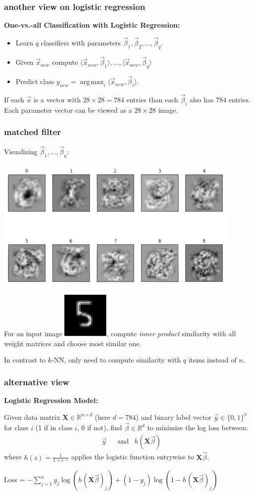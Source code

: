 \documentclass[handout,compress]{beamer}
\newcommand{\bv}[1]{\mathbf{#1}}
\newcommand{\R}{\mathbb{R}}
\DeclareMathOperator*{\argmax}{arg\,max}
\begin{document}
\begin{frame}
	\frametitle{another view on logistic regression}
	\textbf{One-vs.-all Classification with Logistic Regression:}
	\begin{itemize}
		\item Learn $q$ classifiers with parameters $\vec{\beta}_1, \vec{\beta}_2, \ldots, \vec{\beta}_q$.
		\item Given $\vec{x}_{new}$ compute $\langle \vec{x}_{new}, \vec{\beta}_1\rangle, \ldots, \langle\vec{x}_{new}, \vec{\beta}_q\rangle$
		\item Predict class $y_{new} = \argmax_i \langle\vec{x}_{new}, \vec{\beta}_i\rangle$.
	\end{itemize}
	If each $\vec{x}$ is a vector with $28\times 28 = 784$ entries than each $\vec{\beta}_i$ also has $784$ entries. Each parameter vector can be viewed as a $28\times 28$ image. 
\end{frame}

\begin{frame}
	\frametitle{matched filter}
	Visualizing $\vec{\beta}_1, \ldots, \vec{\beta}_q$:
	\begin{center}
		\includegraphics[width=.7\textwidth]{logweights.png}
	\end{center}
For an input image \hspace{.5em}\includegraphics[width=.05\textwidth]{five.png}\hspace{.5em}, compute \emph{inner product} similarity with all weight matrices and choose most similar one. 

In contrast to $k$-NN, only need to compute similarity with $q$ items instead of $n$.
\end{frame}

\begin{frame} 
	\frametitle{alternative view}
	\textbf{Logistic Regression Model:}
	
	Given data matrix $\bv{X} \in \R^{n\times d}$ (here $d = 784$) and binary label vector $\vec{y}\in \{0,1\}^n$ for class $i$ (1 if in class $i$, 0 if not), find $\vec{\beta} \in \R^d$ to minimize the log loss between:
	\begin{align*}
	&\vec{y} & &\text{and} & h(\bv{X}\vec{\beta})
	\end{align*}
	where $h(z) = \frac{1}{1 + e^{-z}}$ applies the logistic function entrywise to $\bv{X}\vec{\beta}$. 
	
	
	Loss = $-\sum_{j=1}^n y_j\log(h(\bv{X}\vec{\beta})_j) +  (1-y_j)\log(1- h(\bv{X}\vec{\beta})_j)$
	
\end{frame}
\end{document}
